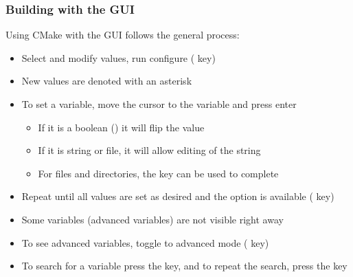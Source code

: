\documentclass[letterpaper,10pt,english]{sphinxmanual}
\begin{document}
\subsubsection{Building with the GUI}
\label{Install:building-with-the-gui}\label{Install:index-2}
Using CMake with the  GUI follows the general process:
\begin{itemize}
\item {} 
Select and modify values, run configure ( key)

\item {} 
New values are denoted with an asterisk

\item {} 
To set a variable, move the cursor to the variable and press enter
\begin{itemize}
\item {} 
If it is a boolean () it will flip the value

\item {} 
If it is string or file, it will allow editing of the string

\item {} 
For files and directories, the  key can be used to
complete

\end{itemize}

\item {} 
Repeat until all values are set as desired and the 
option is available ( key)

\item {} 
Some variables (advanced variables) are not visible right away

\item {} 
To see advanced variables, toggle to advanced mode ( key)

\item {} 
To search for a variable press the \code{/} key, and to repeat the
search, press the  key

\end{itemize}
\end{document}
